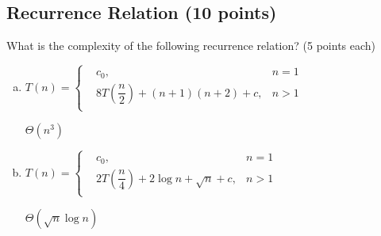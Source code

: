 \documentclass[11pt]{exam}
\begin{document}
\subsection{Recurrence Relation (10 points)}
What is the complexity of the following recurrence relation? (5 points each)
\begin{enumerate}[(a)]

\item $T(n) = \left\{
\begin{aligned}
&c_0, &n=1\\
&8T\left(\dfrac{n}{2}\right)+(n + 1)(n + 2) + c, &n>1\\
\end{aligned}
\right.
$

\begin{solution}
    $\Theta (n^3)$
\end{solution}

\item $T(n) = \left\{
\begin{aligned}
&c_0, &n=1\\
&2T\left(\dfrac{n}{4}\right)+2\log n+\sqrt{n}+c, &n>1\\
\end{aligned}
\right.
$

\begin{solution}
    $\Theta(\sqrt{n} \log n)$
\end{solution}
\end{enumerate}
\end{document}
